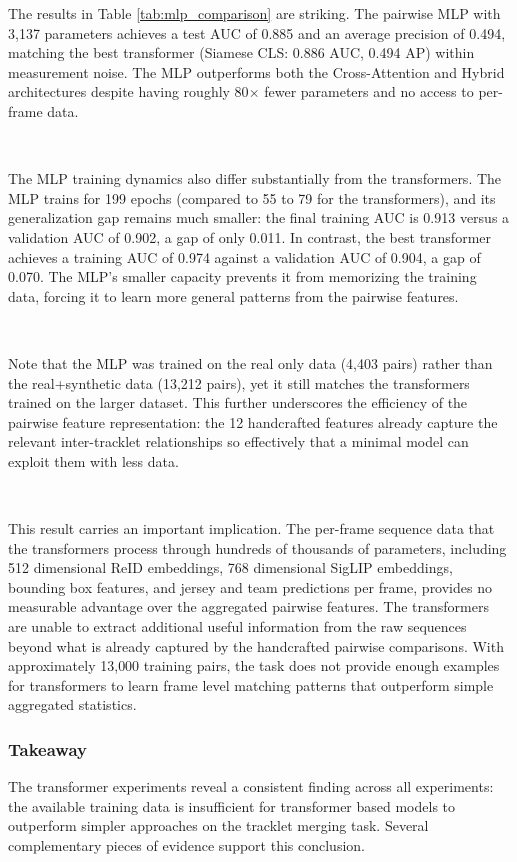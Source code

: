 The results in Table \ref{tab:mlp_comparison} are striking. The pairwise MLP with 3{,}137 parameters achieves a test AUC of 0.885 and an average precision of 0.494, matching the best transformer (Siamese CLS: 0.886 AUC, 0.494 AP) within measurement noise. The MLP outperforms both the Cross-Attention and Hybrid architectures despite having roughly 80$\times$ fewer parameters and no access to per-frame data.

\

The MLP training dynamics also differ substantially from the transformers. The MLP trains for 199 epochs (compared to 55 to 79 for the transformers), and its generalization gap remains much smaller: the final training AUC is 0.913 versus a validation AUC of 0.902, a gap of only 0.011. In contrast, the best transformer achieves a training AUC of 0.974 against a validation AUC of 0.904, a gap of 0.070. The MLP's smaller capacity prevents it from memorizing the training data, forcing it to learn more general patterns from the pairwise features.

\

Note that the MLP was trained on the real only data (4{,}403 pairs) rather than the real+synthetic data (13{,}212 pairs), yet it still matches the transformers trained on the larger dataset. This further underscores the efficiency of the pairwise feature representation: the 12 handcrafted features already capture the relevant inter-tracklet relationships so effectively that a minimal model can exploit them with less data.

\

This result carries an important implication. The per-frame sequence data that the transformers process through hundreds of thousands of parameters, including 512 dimensional ReID embeddings, 768 dimensional SigLIP embeddings, bounding box features, and jersey and team predictions per frame, provides no measurable advantage over the aggregated pairwise features. The transformers are unable to extract additional useful information from the raw sequences beyond what is already captured by the handcrafted pairwise comparisons. With approximately 13{,}000 training pairs, the task does not provide enough examples for transformers to learn frame level matching patterns that outperform simple aggregated statistics.


\subsubsection{Takeaway}\label{sec:transformer_takeaway}
The transformer experiments reveal a consistent finding across all experiments: the available training data is insufficient for transformer based models to outperform simpler approaches on the tracklet merging task. Several complementary pieces of evidence support this conclusion.

